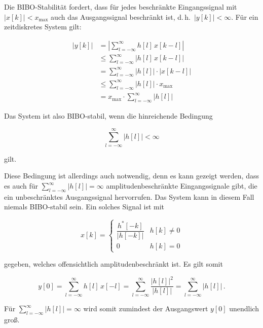 Die BIBO-Stabilität fordert, dass für jedes beschränkte Eingangssignal mit $|x[k]| < x_{\max}$ auch das Ausgangssignal beschränkt ist, d.\,h.\ $|y[k]| < \infty$. Für ein zeitdiskretes System gilt:

\begin{align*}
|y[k]| &= \left|\sum_{l=-\infty}^{\infty} h[l]\,x[k-l]\right| \\
&\leq \sum_{l=-\infty}^{\infty} |h[l]\,x[k-l]| \\
&= \sum_{l=-\infty}^{\infty} |h[l]|\cdot|x[k-l]| \\
&\leq \sum_{l=-\infty}^{\infty} |h[l]|\cdot x_{\max} \\
&= x_{\max}\cdot\sum_{l=-\infty}^{\infty} |h[l]|
\end{align*}

Das System ist also BIBO-stabil, wenn die hinreichende Bedingung

$$
\sum_{l=-\infty}^{\infty} |h[l]| < \infty
$$

gilt.

Diese Bedingung ist allerdings auch notwendig, denn es kann gezeigt werden, dass es auch für $\sum_{l=-\infty}^{\infty} |h[l]| = \infty$ amplitudenbeschränkte Eingangssignale gibt, die ein unbeschränktes Ausgangssignal hervorrufen. Das System kann in diesem Fall niemals BIBO-stabil sein. Ein solches Signal ist mit

$$
x[k] = \begin{cases} \dfrac{h^*[-k]}{|h[-k]|} & h[k] \neq 0 \\ 0 & h[k] = 0 \end{cases}
$$

gegeben, welches offensichtlich amplitudenbeschränkt ist. Es gilt somit

$$
y[0] = \sum_{l=-\infty}^{\infty} h[l]\,x[-l] = \sum_{l=-\infty}^{\infty} \frac{|h[l]|^2}{|h[l]|} = \sum_{l=-\infty}^{\infty} |h[l]|\,.
$$

Für $\sum_{l=-\infty}^{\infty} |h[l]| = \infty$ wird somit zumindest der Ausgangswert $y[0]$ unendlich groß.

